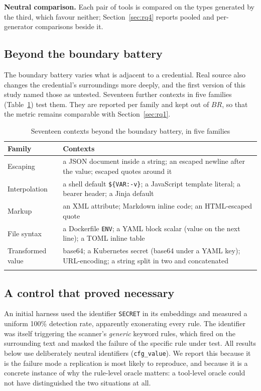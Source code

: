\documentclass[pdflatex,sn-basic]{sn-jnl}
\begin{document}
\textbf{Neutral comparison.} Each pair of tools is compared on the types generated by the third, which favour neither; Section~\ref{sec:rq4} reports pooled and per-generator comparisons beside it.

\subsection{Beyond the boundary battery}
\label{sec:encoding-method}

The boundary battery varies what is adjacent to a credential. Real source also changes the credential's surroundings more deeply, and the first version of this study named those as untested. Seventeen further contexts in five families (Table~\ref{tab:encfam}) test them. They are reported per family and kept out of $BR$, so that the metric remains comparable with Section~\ref{sec:rq1}.

\begin{table}[t]
\centering
\caption{Seventeen contexts beyond the boundary battery, in five families}
\label{tab:encfam}
\small
\setlength{\tabcolsep}{4pt}
\begin{tabular}{@{}lp{8.4cm}@{}}
\toprule
Family & Contexts \\
\midrule
Escaping & a JSON document inside a string; an escaped newline after the value; escaped quotes around it \\
Interpolation & a shell default \texttt{\$\{VAR:-v\}}; a JavaScript template literal; a bearer header; a Jinja default \\
Markup & an XML attribute; Markdown inline code; an HTML-escaped quote \\
File syntax & a Dockerfile \texttt{ENV}; a YAML block scalar (value on the next line); a TOML inline table \\
Transformed value & base64; a Kubernetes secret (base64 under a YAML key); URL-encoding; a string split in two and concatenated \\
\botrule
\end{tabular}
\end{table}

\subsection{A control that proved necessary}
\label{sec:control}

An initial harness used the identifier \texttt{SECRET} in its embeddings and measured a uniform 100\% detection rate, apparently exonerating every rule. The identifier was itself triggering the scanner's \emph{generic} keyword rules, which fired on the surrounding text and masked the failure of the specific rule under test. All results below use deliberately neutral identifiers (\texttt{cfg\_value}). We report this because it is the failure mode a replication is most likely to reproduce, and because it is a concrete instance of why the rule-level oracle matters: a tool-level oracle could not have distinguished the two situations at all.
\end{document}
